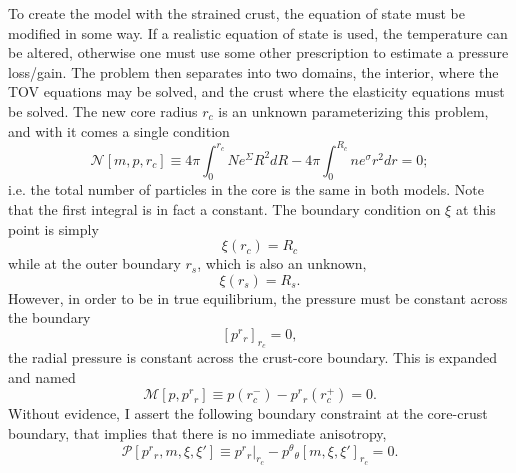 To create the model with the strained crust, the equation of state must be modified in some way. If a realistic equation of state is used, the temperature can be altered, otherwise one must use some other prescription to estimate a pressure loss/gain. The problem then separates into two domains, the interior, where the TOV equations may be solved, and the crust where the elasticity equations must be solved. The new core radius $r_c$ is an unknown parameterizing this problem, and with it comes a single condition
\begin{equation}
\mathcal{N}[m,p,r_c] \equiv 4\pi\int_0^{r_c}{Ne^{\Sigma}R^2dR} - 4\pi\int_0^{R_c}{ne^{\sigma}r^2dr} = 0;
\label{eq:coreNumberConservation}
\end{equation}
i.e. the total number of particles in the core is the same in both models. Note that the first integral is in fact a constant. The boundary condition on $\xi$ at this point is simply
\begin{equation}
\xi(r_c) = R_c
\end{equation}
while at the outer boundary $r_s$, which is also an unknown,
\begin{equation}
\xi(r_s) = R_s.
\end{equation}
However, in order to be in true equilibrium, the pressure must be constant across the boundary
\begin{equation}
\left[p^r{}_r\right]_{r_c} = 0,
\end{equation}
the radial pressure is constant across the crust-core boundary. This is expanded and named
\begin{equation}
\mathcal{M}[p, p^r{}_r] \equiv p(r_c^-) - p^r{}_r(r_c^+) = 0.
\label{eq:coreBoundaryPressure}
\end{equation}
Without evidence, I assert the following boundary constraint at the core-crust boundary, that implies that there is no immediate anisotropy,
\begin{equation}
\mathcal{P}[p^r{}_r,m,\xi,\xi'] \equiv p^r{}_r|_{r_c} - p^\theta{}_\theta[m,\xi,\xi']_{r_c} = 0.
\label{eq:noAnisotropy}
\end{equation}

